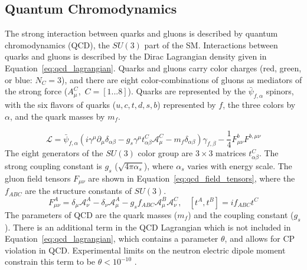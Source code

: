 
\subsection{Quantum Chromodynamics}\label{ch:sm:qcd}

The strong interaction between quarks and gluons is described by quantum chromodynamics (QCD), the $SU(3)$ part of the SM. Interactions between quarks and gluons is described by the Dirac Lagrangian density given in Equation~\ref{eq:qcd_lagrangian}. Quarks and gluons carry color charges (red, green, or blue: $N_C = 3$), and there are eight color-combinations of gluons as mediators of the strong force ($A^C_\mu$,~$C=[1...8]$). Quarks are represented by the $\bar{\psi}_{f,\alpha}$ spinors, with the six flavors of quarks ($u,c,t,d,s,b$) represented by $f$, the three colors by $\alpha$, and the quark masses by $m_f$.


\begin{equation}
    \mathcal{L}=\bar{\psi}_{f,\alpha}(i\gamma^\mu \partial_\mu \delta_{\alpha\beta}-g_s\gamma^\mu t^C_{\alpha\beta}\mathcal{A}^C_\mu-m_f\delta_{\alpha\beta})\gamma_{f,\beta}-\frac{1}{4}F^b_{\mu\nu}F^{b,\mu\nu}
    \label{eq:qcd_lagrangian}
\end{equation}
 The eight generators of the $SU(3)$ color group are $3\times 3$ matrices $t^C_{\alpha\beta}$. The strong coupling constant is $g_s$ ($\sqrt{4\pi\alpha_s}$), where $\alpha_s$ varies with energy scale.  The gluon field tensors $F_{\mu\nu}$ are shown in Equation~\ref{eq:qcd_field_tensors}, where the $f_{ABC}$ are the structure constants of $SU(3)$.
\begin{equation}
F_{\mu\nu}^A = \delta_{\mu} \mathcal{A}^A_{\nu} - \delta_{\nu} \mathcal{A}^A_\mu - g_s f_{ABC} \mathcal{A}_\mu^B \mathcal{A}_\nu^C,~~~~ [t^A, t^B] = if_{ABC}t^C
\label{eq:qcd_field_tensors}
\end{equation}
The parameters of QCD are the quark masses ($m_f$) and the coupling constant ($g_s$). There is an additional term in the QCD Lagrangian which is not included in Equation~\ref{eq:qcd_lagrangian}, which contains a parameter $\theta$, and allows for CP violation in QCD. Experimental limits on the neutron electric dipole moment constrain this term to be $\theta < 10^{-10}$ \cite{PhysRevLett.97.131801}.

